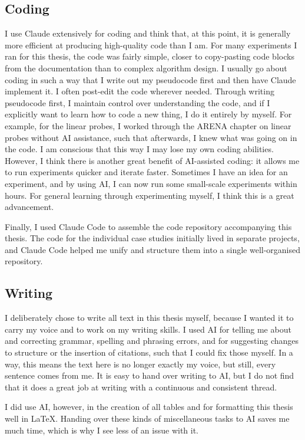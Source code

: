 \subsection{Coding}
I use Claude extensively for coding and think that, at this point, it is generally more efficient at producing high-quality code than I am. For many experiments I ran for this thesis, the code was fairly simple, closer to copy-pasting code blocks from the documentation than to complex algorithm design. I usually go about coding in such a way that I write out my pseudocode first and then have Claude implement it. I often post-edit the code wherever needed. Through writing pseudocode first, I maintain control over understanding the code, and if I explicitly want to learn how to code a new thing, I do it entirely by myself. For example, for the linear probes, I worked through the ARENA chapter on linear probes without AI assistance, such that afterwards, I knew what was going on in the code. I am conscious that this way I may lose my own coding abilities. However, I think there is another great benefit of AI-assisted coding: it allows me to run experiments quicker and iterate faster. Sometimes I have an idea for an experiment, and by using AI, I can now run some small-scale experiments within hours. For general learning through experimenting myself, I think this is a great advancement.

Finally, I used Claude Code to assemble the code repository accompanying this thesis. The code for the individual case studies initially lived in separate projects, and Claude Code helped me unify and structure them into a single well-organised repository.

\subsection{Writing}
I deliberately chose to write all text in this thesis myself, because I wanted it to carry my voice and to work on my writing skills. I used AI for telling me about and correcting grammar, spelling and phrasing errors, and for suggesting changes to structure or the insertion of citations, such that I could fix those myself. In a way, this means the text here is no longer exactly my voice, but still, every sentence comes from me. It is easy to hand over writing to AI, but I do not find that it does a great job at writing with a continuous and consistent thread.

I did use AI, however, in the creation of all tables and for formatting this thesis well in \LaTeX. Handing over these kinds of miscellaneous tasks to AI saves me much time, which is why I see less of an issue with it.
